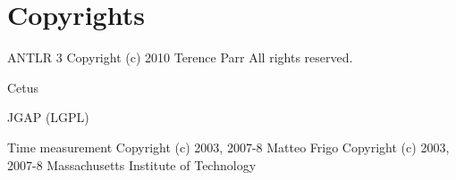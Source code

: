 \chapter*{Copyrights}

ANTLR 3
Copyright (c) 2010 Terence Parr
All rights reserved.

Cetus


JGAP
(LGPL)


Time measurement
Copyright (c) 2003, 2007-8 Matteo Frigo
Copyright (c) 2003, 2007-8 Massachusetts Institute of Technology

